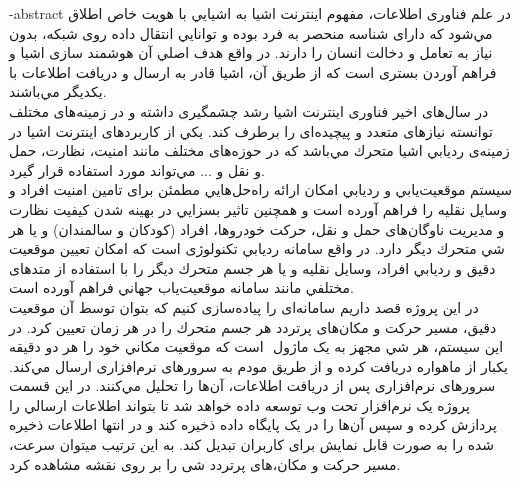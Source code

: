 
 
\surname{}
\fa-abstract{
در علم فناوری اطلاعات، مفهوم اينترنت اشيا به اشيايي با هويت خاص اطلاق مي‌شود كه دارای شناسه منحصر به فرد بوده و توانايي انتقال داده روی شبکه، بدون نياز به تعامل و دخالت انسان را دارند. در واقع هدف اصلي آن هوشمند سازی اشيا و فراهم آوردن بستری است كه از طريق آن،
اشيا قادر به ارسال و دريافت اطلاعات با يکديگر مي‌باشند.
\\
در سال‌های اخير فناوری اينترنت اشيا رشد چشمگيری داشته و در زمينه‌های مختلف توانسته نيازهای متعدد و پيچيده‌ای را برطرف كند. يکي از كاربردهای اينترنت اشيا در زمينه‌ی ‌‌رديابي اشيا متحرك مي‌باشد كه در حوزه‌های مختلف مانند امنيت، نظارت، حمل و نقل و ... مي‌تواند مورد استفاده قرار گيرد.
\\
سيستم موقعيت‌يابي و رديابي امکان ارائه راه‌حل‌هايي مطمئن برای تامين امنيت افراد و وسايل نقليه را فراهم آورده است و همچنين تاثير بسزايي در بهينه شدن كيفيت نظارت و مديريت ناوگان‌های حمل و نقل، حركت خودروها، افراد (کودکان و سالمندان) و يا هر شي متحرك ديگر دارد. در واقع سامانه رديابي تکنولوژی است كه امکان تعيين موقعيت دقيق و رديابي افراد، وسايل نقليه و يا هر جسم متحرك ديگر را با استفاده از متدهای مختلفي مانند
سامانه موقعيت‌ياب جهاني فراهم آورده است.
\\
در اين پروژه قصد داريم سامانه‌ای را پياده‌سازی كنيم كه بتوان توسط آن موقعيت دقيق، مسير حركت و مکان‌های پرتردد هر جسم متحرك را در هر زمان تعیین کرد. در اين سيستم، هر شي مجهز به يک ماژول ‌‌ است كه موقعيت مکاني خود را هر دو دقیقه یکبار از ماهواره دریافت کرده و از طريق مودم  به سرورهای نرم‌افزاری ارسال مي‌كند. سرورهای نرم‌افزاری پس از دريافت اطلاعات، آن‌ها را تحليل مي‌كنند. در اين قسمت پروژه يک نرم‌افزار تحت وب توسعه داده خواهد شد تا بتواند اطلاعات ارسالي را پردازش كرده و سپس آن‌ها را در يک پايگاه داده ذخيره كند و در انتها اطلاعات ذخيره شده را به صورت قابل نمايش برای كاربران تبديل كند. به اين ترتيب ميتوان سرعت، مسير حرکت و مکان،های پرتردد شی را بر روی نقشه مشاهده کرد.
}


